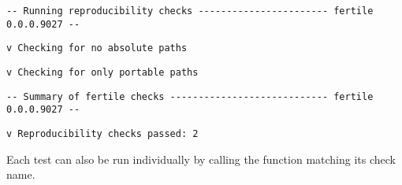 \documentclass[12pt,twoside]{reedthesis}
\begin{document}
\begin{verbatim}
-- Running reproducibility checks ----------------------- fertile 0.0.0.9027 --
\end{verbatim}
\begin{verbatim}
v Checking for no absolute paths
\end{verbatim}
\begin{verbatim}
v Checking for only portable paths
\end{verbatim}
\begin{verbatim}
-- Summary of fertile checks ---------------------------- fertile 0.0.0.9027 --
\end{verbatim}
\begin{verbatim}
v Reproducibility checks passed: 2
\end{verbatim}
Each test can also be run individually by calling the function matching
its check name.
\end{document}
